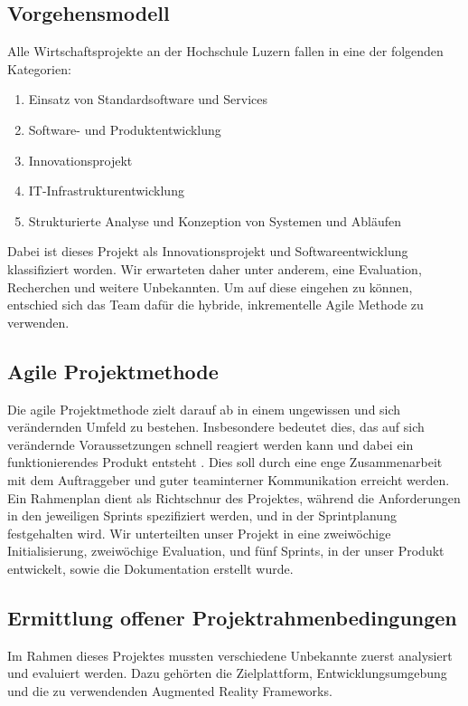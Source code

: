 \documentclass[a4paper]{scrreprt}
\begin{document}
\subsection{Vorgehensmodell}

Alle Wirtschaftsprojekte an der Hochschule Luzern fallen in eine der folgenden Kategorien:

\begin{enumerate}
	\item Einsatz von Standardsoftware und Services
	\item Software- und Produktentwicklung
	\item Innovationsprojekt
	\item IT-Infrastrukturentwicklung
	\item Strukturierte Analyse und Konzeption von Systemen und Abläufen
\end{enumerate}

Dabei ist dieses Projekt als Innovationsprojekt und Softwareentwicklung klassifiziert worden. Wir erwarteten daher unter anderem, eine Evaluation, Recherchen und weitere Unbekannten. Um auf diese eingehen zu können, entschied sich das Team dafür die hybride, inkrementelle Agile Methode zu verwenden.

\subsection{Agile Projektmethode}

Die agile Projektmethode zielt darauf ab in einem ungewissen und sich verändernden Umfeld zu bestehen. Insbesondere bedeutet dies, das auf sich verändernde Voraussetzungen schnell reagiert werden kann und dabei ein funktionierendes Produkt entsteht \parencite{AgileAlliance2015}. Dies soll durch eine enge Zusammenarbeit mit dem Auftraggeber und guter teaminterner Kommunikation erreicht werden.
\bigbreak
Ein Rahmenplan dient als Richtschnur des Projektes, während die Anforderungen in den jeweiligen Sprints spezifiziert werden, und in der Sprintplanung festgehalten wird. Wir unterteilten unser Projekt in eine zweiwöchige Initialisierung, zweiwöchige Evaluation, und fünf Sprints, in der unser Produkt entwickelt, sowie die Dokumentation erstellt wurde.

\subsection{Ermittlung offener Projektrahmenbedingungen}
\label{ch:evaluation}
Im Rahmen dieses Projektes mussten verschiedene Unbekannte zuerst analysiert und evaluiert werden. Dazu gehörten die Zielplattform, Entwicklungsumgebung und die zu verwendenden Augmented Reality Frameworks.
\end{document}
